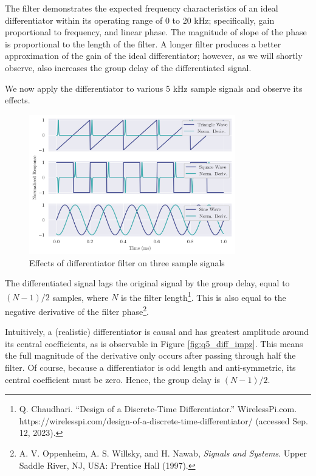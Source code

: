 The filter demonstrates the expected frequency characteristics of an ideal differentiator within its operating range of 0 to 20 kHz; specifically, gain proportional to frequency, and linear phase. The magnitude of slope of the phase is proportional to the length of the filter. A longer filter produces a better approximation of the gain of the ideal differentiator; however, as we will shortly observe, also increases the group delay of the differentiated signal.

\newpage

We now apply the differentiator to various 5 kHz sample signals and observe its effects.

\begin{figure}[!ht]
    \centering
    \includegraphics[width=0.8\textwidth]{images/q5_diff_applied.png}
    \caption{Effects of differentiator filter on three sample signals}
    \label{fig:q5_diff_applied}
\end{figure}

The differentiated signal lags the original signal by the group delay, equal to $(N-1)/2$ samples, where $N$ is the filter length\footnote{Q. Chaudhari. ``Design of a Discrete-Time Differentiator.'' WirelessPi.com. https://wirelesspi.com/design-of-a-discrete-time-differentiator/ (accessed Sep. 12, 2023).}. This is also equal to the negative derivative of the filter phase\footnote{A. V. Oppenheim, A. S. Willsky, and H. Nawab, \textit{Signals and Systems}. Upper Saddle River, NJ, USA: Prentice Hall (1997).}.

Intuitively, a (realistic) differentiator is causal and has greatest amplitude around its central coefficients, as is observable in Figure \ref{fig:q5_diff_impz}. This means the full magnitude of the derivative only occurs after passing through half the filter. Of course, because a differentiator is odd length and anti-symmetric, its central coefficient must be zero. Hence, the group delay is $(N-1)/2$.

